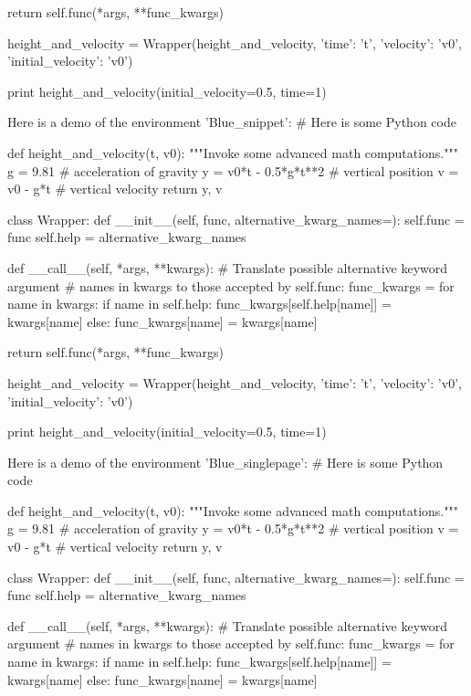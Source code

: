         return self.func(*args, **func_kwargs)

height_and_velocity = Wrapper(height_and_velocity,
                              {'time': 't',
                               'velocity': 'v0',
                               'initial_velocity': 'v0'})

print height_and_velocity(initial_velocity=0.5, time=1)


\noindent
Here is a demo of the environment 'Blue\_snippet':
# Here is some Python code

def height_and_velocity(t, v0):
    """Invoke some advanced math computations."""
    g = 9.81                  # acceleration of gravity
    y = v0*t - 0.5*g*t**2     # vertical position
    v = v0 - g*t              # vertical velocity
    return y, v

class Wrapper:
    def __init__(self, func, alternative_kwarg_names={}):
        self.func = func
        self.help = alternative_kwarg_names

    def __call__(self, *args, **kwargs):
        # Translate possible alternative keyword argument
        # names in kwargs to those accepted by self.func:
        func_kwargs = {}
        for name in kwargs:
            if name in self.help:
                func_kwargs[self.help[name]] = kwargs[name]
            else:
                func_kwargs[name] = kwargs[name]

        return self.func(*args, **func_kwargs)

height_and_velocity = Wrapper(height_and_velocity,
                              {'time': 't',
                               'velocity': 'v0',
                               'initial_velocity': 'v0'})

print height_and_velocity(initial_velocity=0.5, time=1)


\noindent
Here is a demo of the environment 'Blue\_singlepage':
# Here is some Python code

def height_and_velocity(t, v0):
    """Invoke some advanced math computations."""
    g = 9.81                  # acceleration of gravity
    y = v0*t - 0.5*g*t**2     # vertical position
    v = v0 - g*t              # vertical velocity
    return y, v

class Wrapper:
    def __init__(self, func, alternative_kwarg_names={}):
        self.func = func
        self.help = alternative_kwarg_names

    def __call__(self, *args, **kwargs):
        # Translate possible alternative keyword argument
        # names in kwargs to those accepted by self.func:
        func_kwargs = {}
        for name in kwargs:
            if name in self.help:
                func_kwargs[self.help[name]] = kwargs[name]
            else:
                func_kwargs[name] = kwargs[name]

